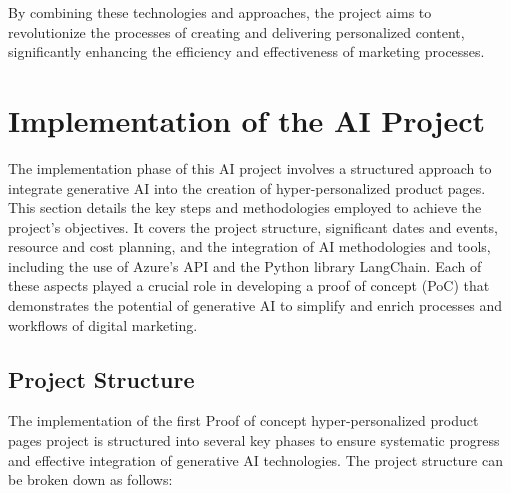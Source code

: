 \documentclass[%
pdftex,
oneside,			%
11pt,				%
parskip=half,		%
headheight = 12pt,	%
headsepline,		%
footsepline,		%
footheight = 16pt,	%
abstracton,		%
DIV=calc,		%
BCOR=8mm,		%
headinclude=false,	%
footinclude=false,	%
listof=totoc,		%
toc=bibliography,	%
]{scrreprt}	%
\begin{document}
    By combining these technologies and approaches, the project aims to revolutionize the processes of creating and delivering personalized content, significantly enhancing the efficiency and effectiveness of marketing processes.



    \newpage

\chapter{Implementation of the AI Project} 

    The implementation phase of this AI project involves a structured approach to integrate generative AI into the creation of hyper-personalized product pages. 
    This section details the key steps and methodologies employed to achieve the project's objectives. 
    It covers the project structure, significant dates and events, resource and cost planning, and the integration of AI methodologies and tools, including the use of Azure's API and the Python library LangChain. 
    Each of these aspects played a crucial role in developing a proof of concept (PoC) that demonstrates the potential of generative AI to simplify and enrich processes and workflows of digital marketing.


    \section{Project Structure}

        The implementation of the first Proof of concept hyper-personalized product pages project is structured into several key phases to ensure systematic progress and effective integration of generative AI technologies. 
        The project structure can be broken down as follows:
\end{document}
